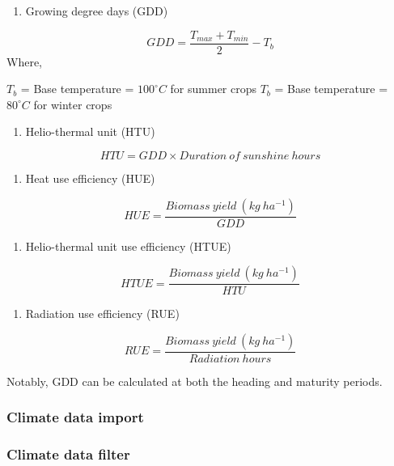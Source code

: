 \documentclass[]{article}
\providecommand{\tightlist}{%
  \setlength{\itemsep}{0pt}\setlength{\parskip}{0pt}}
\begin{document}
\begin{enumerate}
\def\labelenumi{\arabic{enumi}.}
\tightlist
\item
  Growing degree days (GDD)
\end{enumerate}

\[
GDD = \frac{T_{max} + T_{min}}{2}-T_b
\] Where,

\(T_b\) = Base temperature = \(100^{\circ}C\) for summer crops \(T_b\) =
Base temperature = \(80^{\circ}C\) for winter crops

\begin{enumerate}
\def\labelenumi{\arabic{enumi}.}
\setcounter{enumi}{1}
\tightlist
\item
  Helio-thermal unit (HTU)
\end{enumerate}

\[
HTU = GDD \times Duration~of~sunshine~hours
\]

\begin{enumerate}
\def\labelenumi{\arabic{enumi}.}
\setcounter{enumi}{2}
\tightlist
\item
  Heat use efficiency (HUE)
\end{enumerate}

\[
HUE = \frac{Biomass~yield~(kg~ha^{-1})}{GDD}
\]

\begin{enumerate}
\def\labelenumi{\arabic{enumi}.}
\setcounter{enumi}{3}
\tightlist
\item
  Helio-thermal unit use efficiency (HTUE)
\end{enumerate}

\[
HTUE = \frac{Biomass~yield~(kg~ha^{-1})}{HTU}
\]

\begin{enumerate}
\def\labelenumi{\arabic{enumi}.}
\setcounter{enumi}{4}
\tightlist
\item
  Radiation use efficiency (RUE)
\end{enumerate}

\[
RUE = \frac{Biomass~yield~(kg~ha^{-1})}{Radiation~hours}
\]

Notably, GDD can be calculated at both the heading and maturity periods.

\subsubsection{Climate data import}\label{climate-data-import}

\subsubsection{Climate data filter}\label{climate-data-filter}
\end{document}
